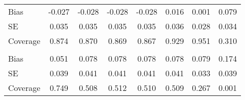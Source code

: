 \begin{appendix}
\begin{table}
\begin{tabular}{lS[table-format = 1.3]S[table-format = 1.3]S[table-format = 1.3]S[table-format = 1.3]S[table-format = 1.3]S[table-format = 1.3]S[table-format = 1.3]}
\hspace{1em}Bias & -0.027 & -0.028 & -0.028 & -0.028 & 0.016 & 0.001 & 0.079\\
\hspace{1em}SE & 0.035 & 0.035 & 0.035 & 0.035 & 0.036 & 0.028 & 0.034\\
\hspace{1em}Coverage & 0.874 & 0.870 & 0.869 & 0.867 & 0.929 & 0.951 & 0.310\\
\addlinespace[0.3em]
\\
\hspace{1em}Bias & 0.051 & 0.078 & 0.078 & 0.078 & 0.078 & 0.079 & 0.174\\
\hspace{1em}SE & 0.039 & 0.041 & 0.041 & 0.041 & 0.041 & 0.033 & 0.039\\
\hspace{1em}Coverage & 0.749 & 0.508 & 0.512 & 0.510 & 0.509 & 0.267 & 0.001\\
\bottomrule
\end{tabular}
\end{table}

\end{appendix}

